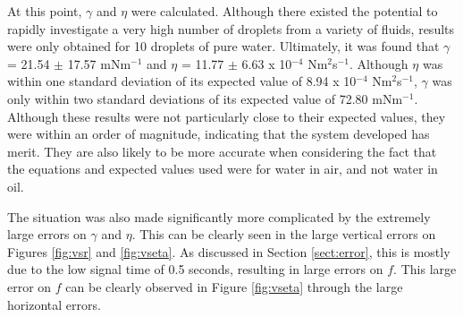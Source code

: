 \documentclass{physics_article_B}
\begin{document}
        At this point, $\gamma$ and $\eta$ were calculated. Although there existed the potential to rapidly investigate a very high number of droplets from a variety of fluids, results were only obtained for 10 droplets of pure water. Ultimately, it was found that $\gamma$ = 21.54 $\pm$ 17.57 mNm$^{-1}$ and $\eta$ = 11.77 $\pm$ 6.63 x 10$^{-4}$ Nm$^{2}$s$^{-1}$. Although $\eta$ was within one standard deviation of its expected value of \cite{expected2} 8.94 x 10$^{-4}$ Nm$^{2}$s$^{-1}$, $\gamma$ was only within two standard deviations of its expected value of\cite{expected1} 72.80 mNm$^{-1}$. Although these results were not particularly close to their expected values, they were within an order of magnitude, indicating that the system developed has merit. They are also likely to be more accurate when considering the fact that the equations and expected values used were for water in air, and not water in oil. 
        
        The situation was also made significantly more complicated by the extremely large errors on $\gamma$ and $\eta$. This can be clearly seen in the large vertical errors on Figures \ref{fig:vsr} and \ref{fig:vseta}. As discussed in Section \ref{sect:error}, this is mostly due to the low signal time of 0.5 seconds, resulting in large errors on $f$. This large error on $f$ can be clearly observed in Figure \ref{fig:vseta} through the large horizontal errors. 
    
\end{document}
